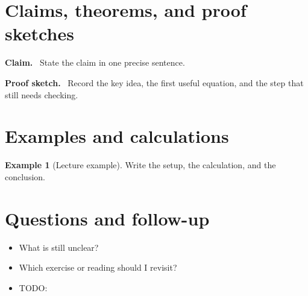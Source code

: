\documentclass[11pt]{article}
\newcommand{\1}{\mathbf{1}}
\theoremstyle{notestyle}
\theoremstyle{definition}
\newtheorem{example}[theorem]{Example}
\newenvironment{claim}
{\par\noindent\textbf{Claim.}\ }
{\par}
\newenvironment{proofsketch}
{\par\noindent\textbf{Proof sketch.}\ }
{\par}
\begin{document}
\section{Claims, theorems, and proof sketches}

\begin{claim}
State the claim in one precise sentence.
\end{claim}

\begin{proofsketch}
Record the key idea, the first useful equation, and the step that still needs checking.
\end{proofsketch}

\section{Examples and calculations}

\begin{example}[Lecture example]
Write the setup, the calculation, and the conclusion.
\end{example}

\section{Questions and follow-up}

\begin{itemize}
    \item What is still unclear?
    \item Which exercise or reading should I revisit?
    \item TODO:
\end{itemize}
\end{document}
